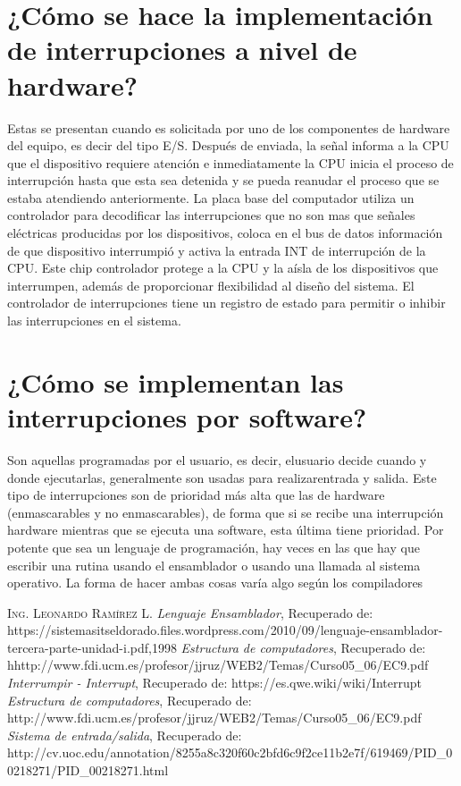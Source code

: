 \documentclass{article}
\begin{document}
\section{¿Cómo se hace la implementación de interrupciones a nivel de hardware?}
Estas se presentan cuando es solicitada por uno de los componentes de hardware del equipo, es decir del tipo E/S. Después de enviada, la señal informa a la CPU que el dispositivo requiere atención e inmediatamente la CPU inicia el proceso de interrupción hasta que esta sea detenida y se pueda reanudar el proceso que se estaba atendiendo anteriormente.
\newline
La placa base del computador utiliza un controlador para decodificar las
interrupciones que no son mas que señales eléctricas producidas por los
dispositivos, coloca en el bus de datos información de que dispositivo interrumpió y
activa la entrada INT de interrupción de la CPU. Este chip controlador protege a la
CPU y la aísla de los dispositivos que interrumpen, además de proporcionar
flexibilidad al diseño del sistema. El controlador de interrupciones tiene un registro
de estado para permitir o inhibir las interrupciones en el sistema.
\section{¿Cómo se implementan las interrupciones por software?}
Son aquellas programadas por el usuario, es decir, elusuario decide cuando y donde ejecutarlas, generalmente son usadas para realizarentrada y salida.
Este tipo de interrupciones son de prioridad más alta que las de hardware (enmascarables y no enmascarables), de forma que si se recibe una interrupción hardware mientras que se ejecuta una software, esta última tiene prioridad. 
\newline
Por potente que sea un lenguaje de programación, hay veces en las que hay que escribir una rutina usando el ensamblador o usando una llamada al sistema operativo. La forma de hacer ambas cosas varía algo según los compiladores




\newpage

\begin{thebibliography}{X}
 \textsc{Ing. Leonardo Ramírez L. }
\textit{Lenguaje Ensamblador}, Recuperado de: https://sistemasitseldorado.files.wordpress.com/2010/09/lenguaje-ensamblador-tercera-parte-unidad-i.pdf,1998
\textit{Estructura de computadores}, Recuperado de: hhttp://www.fdi.ucm.es/profesor/jjruz/WEB2/Temas/Curso05_06/EC9.pdf
\textit{Interrumpir - Interrupt}, Recuperado de: https://es.qwe.wiki/wiki/Interrupt
\textit{Estructura de computadores}, Recuperado de: http://www.fdi.ucm.es/profesor/jjruz/WEB2/Temas/Curso05_06/EC9.pdf
\textit{Sistema de entrada/salida}, 
Recuperado de: http://cv.uoc.edu/annotation/8255a8c320f60c2bfd6c9f2ce11b2e7f/619469/PID_00218271/PID_00218271.html



\end{thebibliography}
\end{document}
